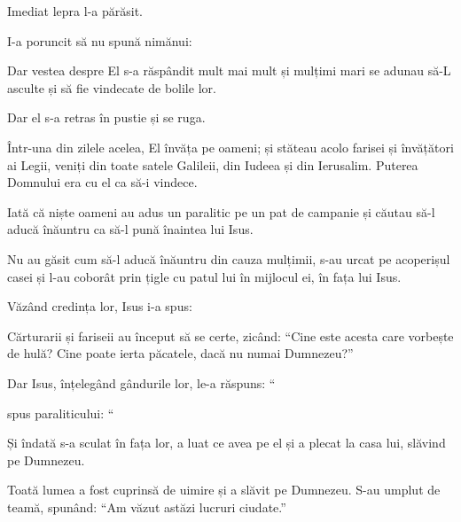 {\par }{\PP Imediat lepra l-a părăsit.

I-a poruncit să nu spună nimănui:
{}


\par }{\PP {}Dar vestea despre El s-a răspândit mult mai mult și mulțimi mari se adunau să-L asculte și să fie vindecate de bolile lor.

Dar el s-a retras în pustie și se ruga.


\par }{\PP {}Într-una din zilele acelea, El învăța pe oameni; și stăteau acolo farisei și învățători ai Legii, veniți din toate satele Galileii, din Iudeea și din Ierusalim. Puterea Domnului era cu el ca să-i vindece.

Iată că niște oameni au adus un paralitic pe un pat de campanie și căutau să-l aducă înăuntru ca să-l pună înaintea lui Isus.

Nu au găsit cum să-l aducă înăuntru din cauza mulțimii, s-au urcat pe acoperișul casei și l-au coborât prin țigle cu patul lui în mijlocul ei, în fața lui Isus.

Văzând credința lor, Isus i-a spus:
{}


\par }{\PP {}Cărturarii și fariseii au început să se certe, zicând: “Cine este acesta care vorbește de hulă? Cine poate ierta păcatele, dacă nu numai Dumnezeu?”


\par }{\PP {}Dar Isus, înțelegând gândurile lor, le-a răspuns: “{}


spus paraliticului: “{}


\par }{\PP {}Și îndată s-a sculat în fața lor, a luat ce avea pe el și a plecat la casa lui, slăvind pe Dumnezeu.

Toată lumea a fost cuprinsă de uimire și a slăvit pe Dumnezeu. S-au umplut de teamă, spunând: “Am văzut astăzi lucruri ciudate.”


}
